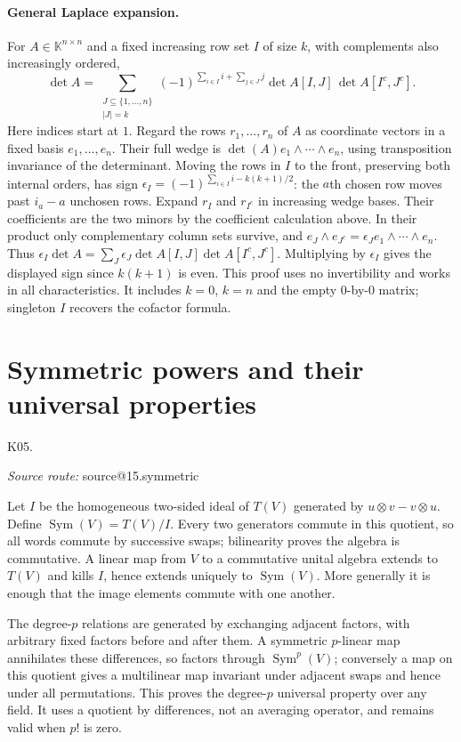 \documentclass[11pt,a4paper]{book}
\makeatletter
\theoremstyle{definition}\newtheorem{definition}[theorem]{Definition}
\theoremstyle{remark}\newtheorem{remark}[theorem]{Remark}
\newcommand{\K}{\mathbb K}\newcommand{\R}{\mathbb R}\newcommand{\C}{\mathbb C}
\DeclareMathOperator{\Sym}{Sym}\DeclareMathOperator{\Ann}{Ann}
\newcommand{\Kentry}[2]{\section{#2}\label{k:#1}\noindent\textsf{\small K05.\detokenize{#1}}\par
  \begingroup\small\color{black!65}\textit{Source route: }\csname source@#1\endcsname\par\endgroup}
\makeatother
\begin{document}
\paragraph{General Laplace expansion.}
For $A\in\K^{n\times n}$ and a fixed increasing row set $I$ of size $k$, with complements also increasingly ordered,
\[
 \det A=\sum_{\substack{J\subseteq\{1,\ldots,n\}\\|J|=k}}
 (-1)^{\sum_{i\in I}i+\sum_{j\in J}j}
 \det A[I,J]\,\det A[I^c,J^c].
\]
Here indices start at $1$. Regard the rows $r_1,\ldots,r_n$ of $A$ as coordinate vectors in a fixed basis $e_1,\ldots,e_n$. Their full wedge is $\det(A)e_1\wedge\cdots\wedge e_n$, using transposition invariance of the determinant. Moving the rows in $I$ to the front, preserving both internal orders, has sign
$\epsilon_I=(-1)^{\sum_{i\in I}i-k(k+1)/2}$: the $a$th chosen row moves past $i_a-a$ unchosen rows. Expand $r_I$ and $r_{I^c}$ in increasing wedge bases. Their coefficients are the two minors by the coefficient calculation above. In their product only complementary column sets survive, and $e_J\wedge e_{J^c}=\epsilon_J e_1\wedge\cdots\wedge e_n$. Thus
$\epsilon_I\det A=\sum_J\epsilon_J\det A[I,J]\det A[I^c,J^c]$.
Multiplying by $\epsilon_I$ gives the displayed sign since $k(k+1)$ is even. This proof uses no invertibility and works in all characteristics. It includes $k=0$, $k=n$ and the empty $0$-by-$0$ matrix; singleton $I$ recovers the cofactor formula.

\Kentry{15.symmetric}{Symmetric powers and their universal properties}
Let $I$ be the homogeneous two-sided ideal of $T(V)$ generated by $u\otimes v-v\otimes u$. Define $\Sym(V)=T(V)/I$. Every two generators commute in this quotient, so all words commute by successive swaps; bilinearity proves the algebra is commutative. A linear map from $V$ to a commutative unital algebra extends to $T(V)$ and kills $I$, hence extends uniquely to $\Sym(V)$. More generally it is enough that the image elements commute with one another.

The degree-$p$ relations are generated by exchanging adjacent factors, with arbitrary fixed factors before and after them. A symmetric $p$-linear map annihilates these differences, so factors through $\Sym^p(V)$; conversely a map on this quotient gives a multilinear map invariant under adjacent swaps and hence under all permutations. This proves the degree-$p$ universal property over any field. It uses a quotient by differences, not an averaging operator, and remains valid when $p!$ is zero.
\end{document}
